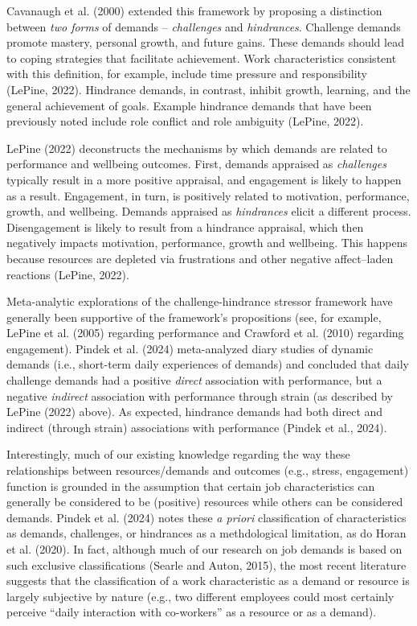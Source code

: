 \documentclass[
  man]{apa7}
\begin{document}
Cavanaugh et al. (2000) extended this framework by proposing a distinction between \emph{two forms} of demands -- \emph{challenges} and \emph{hindrances}. Challenge demands promote mastery, personal growth, and future gains. These demands should lead to coping strategies that facilitate achievement. Work characteristics consistent with this definition, for example, include time pressure and responsibility (LePine, 2022). Hindrance demands, in contrast, inhibit growth, learning, and the general achievement of goals. Example hindrance demands that have been previously noted include role conflict and role ambiguity (LePine, 2022).

LePine (2022) deconstructs the mechanisms by which demands are related to performance and wellbeing outcomes. First, demands appraised as \emph{challenges} typically result in a more positive appraisal, and engagement is likely to happen as a result. Engagement, in turn, is positively related to motivation, performance, growth, and wellbeing. Demands appraised as \emph{hindrances} elicit a different process. Disengagement is likely to result from a hindrance appraisal, which then negatively impacts motivation, performance, growth and wellbeing. This happens because resources are depleted via frustrations and other negative affect--laden reactions (LePine, 2022).

Meta-analytic explorations of the challenge-hindrance stressor framework have generally been supportive of the framework's propositions (see, for example, LePine et al. (2005) regarding performance and Crawford et al. (2010) regarding engagement). Pindek et al. (2024) meta-analyzed diary studies of dynamic demands (i.e., short-term daily experiences of demands) and concluded that daily challenge demands had a positive \emph{direct} association with performance, but a negative \emph{indirect} association with performance through strain (as described by LePine (2022) above). As expected, hindrance demands had both direct and indirect (through strain) associations with performance (Pindek et al., 2024).

Interestingly, much of our existing knowledge regarding the way these relationships between resources/demands and outcomes (e.g., stress, engagement) function is grounded in the assumption that certain job characteristics can generally be considered to be (positive) resources while others can be considered demands. Pindek et al. (2024) notes these \emph{a priori} classification of characteristics as demands, challenges, or hindrances as a methdological limitation, as do Horan et al. (2020). In fact, although much of our research on job demands is based on such exclusive classifications (Searle and Auton, 2015), the most recent literature suggests that the classification of a work characteristic as a demand or resource is largely subjective by nature (e.g., two different employees could most certainly perceive ``daily interaction with co-workers'' as a resource or as a demand).
\end{document}
